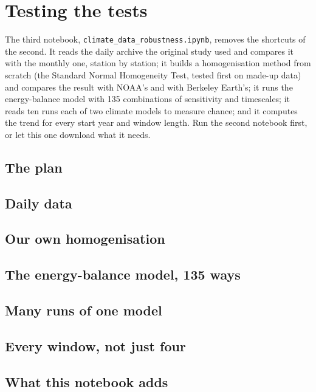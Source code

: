\chapter{Testing the tests}\label{ch:robust}

The third notebook, \texttt{climate\_data\_robustness.ipynb}, removes the shortcuts of the second. It reads the
daily archive the original study used and compares it with the monthly one, station by station; it builds a
homogenisation method from scratch (the Standard Normal Homogeneity Test, tested first on made-up data) and compares
the result with NOAA's and with Berkeley Earth's; it runs the energy-balance model with 135 combinations of
sensitivity and timescales; it reads ten runs each of two climate models to measure chance; and it computes the
trend for every start year and window length. Run the second notebook first, or let this one download what it
needs.

\section{The plan}

\section{Daily data}

\section{Our own homogenisation}

\section{The energy-balance model, 135 ways}

\section{Many runs of one model}

\section{Every window, not just four}

\section{What this notebook adds}

